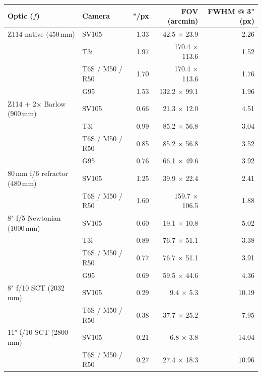 \documentclass[11pt]{article}
\begin{document}
\begin{center}
\scriptsize
\begin{longtable}{@{}llrrr@{}}
\toprule
\textbf{Optic ($f$)} & \textbf{Camera} & \textbf{"/px} & \textbf{FOV (arcmin)} & \textbf{FWHM @ 3" (px)} \\
\midrule
\endhead
Z114 native (450\,mm)  & SV105  & 1.33 & 42.5 $\times$ 23.9 & 2.26 \\
                       & T3i    & 1.97 & 170.4 $\times$ 113.6 & 1.52 \\
                       & T6S / M50 / R50 & 1.70 & 170.4 $\times$ 113.6 & 1.76 \\
                       & G95    & 1.53 & 132.2 $\times$ 99.1 & 1.96 \\
\midrule
Z114 + 2$\times$ Barlow (900\,mm) & SV105 & 0.66 & 21.3 $\times$ 12.0 & 4.51 \\
                       & T3i    & 0.99 & 85.2 $\times$ 56.8 & 3.04 \\
                       & T6S / M50 / R50 & 0.85 & 85.2 $\times$ 56.8 & 3.52 \\
                       & G95    & 0.76 & 66.1 $\times$ 49.6 & 3.92 \\
\midrule
80\,mm f/6 refractor (480\,mm) & SV105 & 1.25 & 39.9 $\times$ 22.4 & 2.41 \\
                       & T6S / M50 / R50 & 1.60 & 159.7 $\times$ 106.5 & 1.88 \\
\midrule
8" f/5 Newtonian (1000\,mm) & SV105 & 0.60 & 19.1 $\times$ 10.8 & 5.02 \\
                       & T3i    & 0.89 & 76.7 $\times$ 51.1 & 3.38 \\
                       & T6S / M50 / R50 & 0.77 & 76.7 $\times$ 51.1 & 3.91 \\
                       & G95    & 0.69 & 59.5 $\times$ 44.6 & 4.36 \\
\midrule
8" f/10 SCT (2032\,mm) & SV105  & 0.29 & 9.4 $\times$ 5.3 & 10.19 \\
                       & T6S / M50 / R50 & 0.38 & 37.7 $\times$ 25.2 & 7.95 \\
\midrule
11" f/10 SCT (2800\,mm) & SV105 & 0.21 & 6.8 $\times$ 3.8 & 14.04 \\
                       & T6S / M50 / R50 & 0.27 & 27.4 $\times$ 18.3 & 10.96 \\
\bottomrule
\end{longtable}
\end{center}
\end{document}
